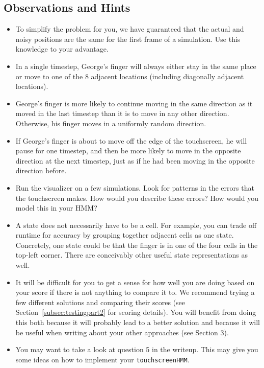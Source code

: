 \documentclass{article}
\begin{document}
\subsection{Observations and Hints}
\begin{itemize}
    \item To simplify the problem for you, we have guaranteed that the actual and noisy positions are the same for the first frame of a simulation. Use this knowledge to your advantage.
    \item In a single timestep, George’s finger will always either stay in the same place or move to one of the 8 adjacent locations (including diagonally adjacent locations).
    \item George’s finger is more likely to continue moving in the same direction as it moved in the last timestep than it is to move in any other direction. Otherwise, his finger moves in a uniformly random direction.
    \item If George’s finger is about to move off the edge of the touchscreen, he will pause for one timestep, and then be more likely to move in the opposite direction at the next timestep, just as if he had been moving in the opposite direction before.
    \item Run the visualizer on a few simulations. Look for patterns in the errors that the touchscreen makes. How would you describe these errors? How would you model this in your HMM?
    \item A state does not necessarily have to be a cell. For example, you can trade off runtime for accuracy by grouping together adjacent cells as one state. Concretely, one state could be that the finger is in one of the four cells in the top-left corner. There are conceivably other useful state representations as well.
    \item It will be difficult for you to get a sense for how well you are doing based on your score if there is not anything to compare it to. We recommend trying a few different solutions and comparing their scores (see Section~\ref{subsec:testingpart2} for scoring details). You will benefit from doing this both because it will probably lead to a better solution and because it will be useful when writing about your other approaches (see Section 3).
    \item You may want to take a look at question 5 in the writeup. This may give you some ideas on how to implement your \texttt{touchscreenHMM}.
\end{itemize}
\end{document}
